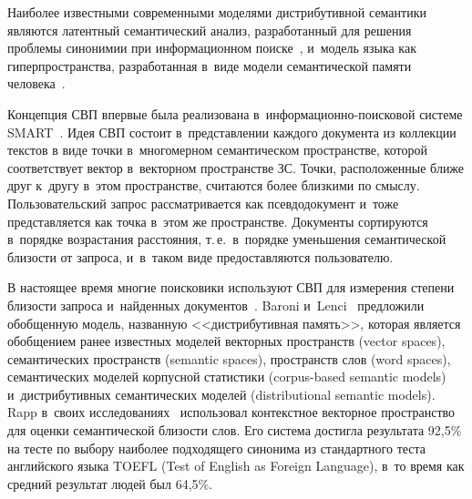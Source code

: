 \begin{multicols}{2}
     Наиболее известными современными моделями дистрибутивной
семантики являются латентный семантический анализ, разработанный для
решения проблемы синонимии при информационном поиске~\cite{20-koz}, и~модель языка как гиперпространства, разработанная в~виде модели
семантической памяти человека~\cite{21-koz}.

     Концепция СВП впервые была реализована
     в~ин\-фор\-ма\-ци\-он\-но-поиско\-вой системе SMART~\cite{28-koz}.
Идея СВП состоит в~представлении каждого документа из коллекции текстов
в виде точки в~многомерном семантическом пространстве, которой
соответствует вектор в~векторном пространстве ЗС.
Точки, расположенные ближе друг к~другу в~этом пространстве, считаются
более близкими по смыс\-лу. Пользовательский запрос рассматривается как
псевдодокумент и~тоже представляется как точка в~этом же пространстве.
Документы сортируются в~порядке возрастания расстояния, т.\,е.\ в~порядке
уменьшения семантической близости от запроса, и~в~таком виде
предоставляются пользователю.

     В настоящее время многие поисковики используют СВП для измерения
степени близости запроса и~найденных документов~\cite{22-koz}. Baroni и~Lenci~\cite{9-koz} предложили обобщенную модель, названную
<<дистрибутив\-ная память>>, которая является обобщением ранее известных
моделей векторных пространств (vector spaces), семантических пространств
(semantic spaces), пространств слов (word spaces), семантических моделей
корпусной статистики (corpus-based semantic models) и~дистрибутивных
семантических моделей (distributional semantic models). Rapp в~своих
исследованиях~\cite{7-koz} использовал контекстное векторное
пространство для оценки семантической близости слов. Его сис\-те\-ма достигла
результата 92,5\% на тесте по выбору наиболее подходящего синонима из
стандартного теста английского языка TOEFL (Test of English as Foreign Language), в~то время как средний
результат людей был 64,5\%.


\end{multicols}
